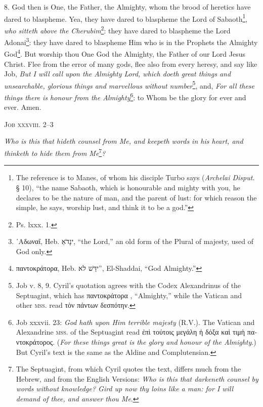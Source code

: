 8. God then is One, the Father, the Almighty, whom the brood of heretics have dared to blaspheme. Yea, they have dared to blaspheme the Lord of Sabaoth\footnote{The reference is to Manes, of whom his disciple Turbo says (\emph{Archelai Disput}. § 10), “the name Sabaoth, which is honourable and mighty with you, he declares to be the nature of man, and the parent of lust: for which reason the simple, he says, worship lust, and think it to be a god.”}, \emph{who sitteth above the Cherubim}\footnote{Ps. lxxx. 1.}: they have dared to blaspheme the Lord Adonai\footnote{\textgreek{᾽Αδωναΐ}, Heb. \texthebrew{י\texthebrew{נָדֹאַ}}, “the Lord,” an old form of the Plural of majesty, used of God only.}: they have dared to blaspheme Him who is in the Prophets the Almighty God\footnote{\textgreek{παντοκράτορα}, Heb. \texthebrew{י\texthebrew{דַּשׁ לא}”}, El-Shaddai, “God Almighty.”}. But worship thou One God the Almighty, the Father of our Lord Jesus Christ. Flee from the error of many gods, flee also from every heresy, and say like Job, \emph{But I will call upon the Almighty Lord, which doeth great things and unsearchable, glorious things and marvellous without number}\footnote{Job v. 8, 9. Cyril’s quotation agrees with the Codex Alexandrinus of the Septuagint, which has \textgreek{παντοκράτορα} , “Almighty,” while the Vatican and other \textsc{mss.} read \textgreek{τὸν πάντων δεσπότην}.}, and, \emph{For all these things there is honour from the Almighty}\footnote{Job xxxvii. 23: \emph{God hath upon Him terrible majesty} (R.V.). The Vatican and Alexandrine \textsc{mss.} of the Septuagint read \textgreek{ἐπὶ τούτοις μεγάλη ἡ δόξα καὶ τιμὴ παντοκράτορος}. (\emph{For these things great is the glory and honour of the Almighty}.) But Cyril’s text is the same as the Aldine and Complutensian.}: to Whom be the glory for ever and ever. Amen.


\textsc{Job xxxviii. 2–3}

\emph{Who is this that hideth counsel from Me, and keepeth words in his heart, and thinketh to hide them from Me}\footnote{The Septuagint, from which Cyril quotes the text, differs much from the Hebrew, and from the English Versions: \emph{Who is this that darkeneth counsel by words without knowledge? Gird up now thy loins like a man: for I will demand of thee, and answer thou Me}.}\emph{?}

